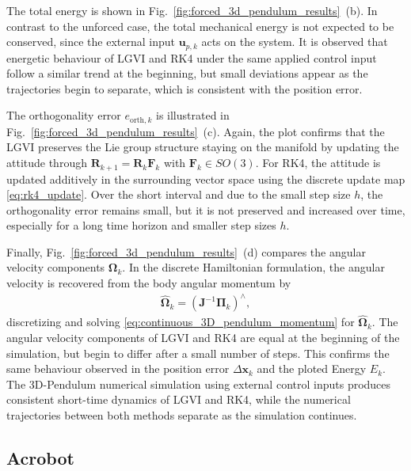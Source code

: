 The total energy is shown in Fig.~\ref{fig:forced_3d_pendulum_results}~(b).
In contrast to the unforced case, the total mechanical energy is not expected to be
conserved, since the external input $\bm{u}_{p,k}$ acts on the system. It is observed that
energetic behaviour of LGVI and RK4 under the same applied control
input follow a similar trend at the beginning, but small deviations
appear as the trajectories begin to separate, which is consistent with the position error.

The orthogonality error $e_{\mathrm{orth},k}$ is illustrated in Fig.~\ref{fig:forced_3d_pendulum_results}~(c).
Again, the plot confirms that the LGVI preserves the Lie group structure staying on the manifold by updating the attitude through
$\bm{R}_{k+1}=\bm{R}_k\bm{F}_k$ with $\bm{F}_k\in SO(3)$. For RK4, the attitude is
updated additively in the surrounding vector space using the discrete update map \eqref{eq:rk4_update}. Over the short interval and due
to the small step size $h$, the orthogonality error remains small, but it is not preserved and increased over time, especially for a long time horizon and smaller step sizes $h$.

Finally, Fig.~\ref{fig:forced_3d_pendulum_results}~(d) compares the angular
velocity components $\bm{\Omega}_k$. In the discrete Hamiltonian formulation, the angular velocity
is recovered from the body angular momentum by
\begin{align}
    \hat{\bm{\Omega}}_k
    =
    (\bm{J}^{-1}\bm{\Pi}_k)^\wedge,
\end{align}
discretizing and solving \eqref{eq:continuous_3D_pendulum_momentum} for $\hat{\bm{\Omega}}_k$.
The angular velocity components of LGVI and RK4 are equal at the beginning of the
simulation, but begin to differ after a small number of steps. This confirms the
same behaviour observed in the position error $\Delta \bm{x}_k$ and the ploted Energy $E_k$.
The 3D-Pendulum numerical simulation using external control inputs produces
consistent short-time dynamics of LGVI and RK4, while the numerical trajectories between both methods separate as the
simulation continues.

\subsection{Acrobot}
\label{subsec:evaluation_acrobot}


